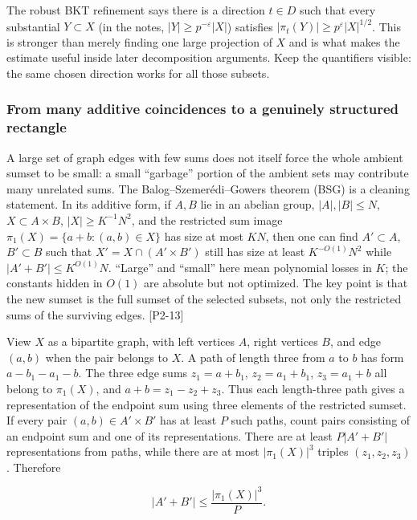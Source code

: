 The robust BKT refinement says there is a direction \(t\in D\) such that every substantial \(Y\subset X\) (in the notes, \(|Y|\ge p^{-\varepsilon}|X|\)) satisfies \(|\pi_t(Y)|\ge p^{\varepsilon}|X|^{1/2}\). This is stronger than merely finding one large projection of \(X\) and is what makes the estimate useful inside later decomposition arguments. Keep the quantifiers visible: the same chosen direction works for all those subsets.

\subsubsection{From many additive coincidences to a genuinely structured rectangle}\label{04-visual-computing-ii-ch033-from-many-additive-coincidences-to-a-genuinely-structured-rectangle}

A large set of graph edges with few sums does not itself force the whole ambient sumset to be small: a small ``garbage'' portion of the ambient sets may contribute many unrelated sums. The Balog--Szemerédi--Gowers theorem (BSG) is a cleaning statement. In its additive form, if \(A,B\) lie in an abelian group, \(|A|,|B|\le N\), \(X\subset A\times B\), \(|X|\ge K^{-1}N^2\), and the restricted sum image \(\pi_1(X)=\{a+b:(a,b)\in X\}\) has size at most \(KN\), then one can find \(A'\subset A\), \(B'\subset B\) such that \(X'=X\cap(A'\times B')\) still has size at least \(K^{-O(1)}N^2\) while \(|A'+B'|\le K^{O(1)}N\). ``Large'' and ``small'' here mean polynomial losses in \(K\); the constants hidden in \(O(1)\) are absolute but not optimized. The key point is that the new sumset is the full sumset of the selected subsets, not only the restricted sums of the surviving edges. {[}P2-13{]}

View \(X\) as a bipartite graph, with left vertices \(A\), right vertices \(B\), and edge \((a,b)\) when the pair belongs to \(X\). A path of length three from \(a\) to \(b\) has form \(a-b_1-a_1-b\). The three edge sums \(z_1=a+b_1\), \(z_2=a_1+b_1\), \(z_3=a_1+b\) all belong to \(\pi_1(X)\), and \(a+b=z_1-z_2+z_3\). Thus each length-three path gives a representation of the endpoint sum using three elements of the restricted sumset. If every pair \((a,b)\in A'\times B'\) has at least \(P\) such paths, count pairs consisting of an endpoint sum and one of its representations. There are at least \(P|A'+B'|\) representations from paths, while there are at most \(|\pi_1(X)|^3\) triples \((z_1,z_2,z_3)\). Therefore

\[|A'+B'|\le \frac{|\pi_1(X)|^3}{P}.\]

